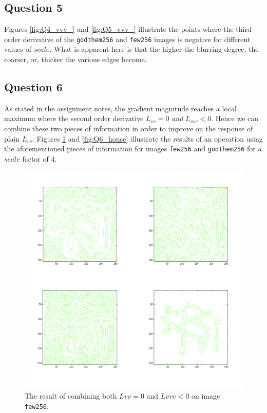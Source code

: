 \subsection{Question 5}

Figures \ref{fig:Q4_vvv_} and \ref{fig:Q5_vvv_} illustrate the points where the
third order derivative of the \texttt{godthem256} and \texttt{few256} images
is negative for different values of $scale$. What is apparent here is that
the higher the blurring degree, the coarser, or, thicker the various edges
become.

\subsection{Question 6}

As stated in the assignment notes, the gradient magnitude reaches a local
maximum where the second order derivative $L_{vv} = 0$ \textit{and} $L_{vvv} < 0$.
Hence we can combine these two pieces of information in order to improve on the
response of plain $L_{vv}$. Figures \ref{fig:Q6_tools} and \ref{fig:Q6_house}
illustrate the results of an operation using the aforementioned pieces of
information for images \texttt{few256} and \texttt{godthem256} for a
$scale$ factor of $4$.


\begin{figure}[H]
	\centering
	\includegraphics[scale=0.6]{./images/Q6/tools_combo.png}
  \caption{The result of combining both $Lvv = 0$ and $Lvvv < 0$ on image \texttt{few256}.}
	\label{fig:Q6_tools}
\end{figure}

